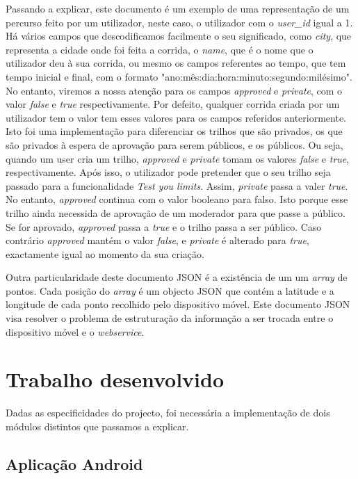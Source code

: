 \documentclass[twocolumn,twoside,10pt,a4paper]{article}
\begin{document}
Passando a explicar, este documento é um exemplo de uma representação de um percurso feito por um utilizador, neste caso, o utilizador com o \textit{user\_id} igual a 1. Há vários campos que descodificamos facilmente o seu significado, como \textit{city}, que representa a cidade onde foi feita a corrida, o \textit{name}, que é o nome que o utilizador deu à sua corrida, ou mesmo os campos referentes ao tempo, que tem tempo inicial e final, com o formato "ano:mês:dia:hora:minuto:segundo:milésimo". No entanto, viremos a nossa atenção para os campos \textit{approved} e \textit{private}, com o valor \textit{false} e \textit{true} respectivamente. Por defeito, qualquer corrida criada por um utilizador tem o valor tem esses valores para os campos referidos anteriormente. Isto foi uma implementação para diferenciar os trilhos que são privados, os que são privados à espera de aprovação para serem públicos, e os públicos. Ou seja, quando um user cria um trilho, \textit{approved} e \textit{private} tomam os valores \textit{false} e \textit{true}, respectivamente. Após isso, o utilizador pode pretender que o seu trilho seja passado para a funcionalidade \textit{Test you limits}. Assim, \textit{private} passa a valer \textit{true}. No entanto, \textit{approved} continua com o valor booleano para falso. Isto porque esse trilho ainda necessida de aprovação de um moderador para que passe a público. Se for aprovado, \textit{approved} passa a \textit{true} e o trilho passa a ser público. Caso contrário \textit{approved} mantém o valor \textit{false}, e \textit{private} é alterado para \textit{true}, exactamente igual ao momento da sua criação.

Outra particularidade deste documento JSON é a existência de um um \textit{array} de pontos. Cada posição do \textit{array} é um objecto JSON que contém a latitude e a longitude de cada ponto recolhido pelo dispositivo móvel.
Este documento JSON visa resolver o problema de estruturação da informação a ser trocada entre o dispositivo móvel e o \textit{webservice}. 

\section{Trabalho desenvolvido}\label{sec:trabalhodesenvolvido}
Dadas as especificidades do projecto, foi necessária a implementação de dois módulos distintos que passamos a explicar.

\subsection{Aplicação Android}
\end{document}
